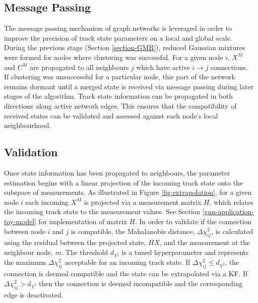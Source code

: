 \subsection{Message Passing}
The message passing mechanism of graph networks is leveraged in order to improve the precision of track state parameters on a local and global scale. During the previous stage (Section \ref{section-GMR}), reduced Gaussian mixtures were formed for nodes where clustering was successful. For a given node $i$, $X^M$ and $C^M$ are propagated to all neighbours $j$ which have active $i \rightarrow j$ connections. If clustering was unsuccessful for a particular node, this part of the network remains dormant until a merged state is received via message passing during later stages of the algorithm. Track state information can be propagated in both directions along active network edges. This ensures that the compatibility of received states can be validated and assessed against each node's local neighbourhood.


\subsection{Validation}
Once state information has been propagated to neighbours, the parameter estimation begins with a linear projection of the incoming track state onto the subspace of measurements. As illustrated in Figure \ref{fig:extrapolation}, for a given node $i$ each incoming $X^M$ is projected via a measurement matrix $H$, which relates the incoming track state to the measurement values. See Section \ref{gnn-application-toy-model} for implementation of matrix $H$. In order to validate if the connection between node $i$ and $j$ is compatible, the Mahalanobis distance, $\Delta \chi^{2}_{ij}$, is calculated using the residual between the projected state, $HX$, and the measurement at the neighbour node, $m$. The threshold $d_{\chi^{2}}$ is a tuned hyperparameter and represents the maximum $\Delta \chi^{2}_{ij}$ acceptable for an incoming track state. If $\Delta \chi^{2}_{ij} \leq d_{\chi^{2}}$, the connection is deemed compatible and the state can be extrapolated via a KF. If $\Delta \chi^{2}_{ij} > d_{\chi^{2}}$ then the connection is deemed incompatible and the corresponding edge is deactivated.

